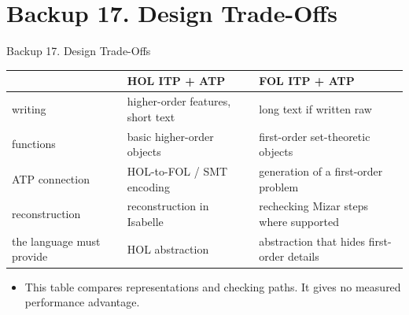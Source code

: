 \documentclass[aspectratio=169,11pt]{beamer}
\begin{document}
\section{Backup 17. Design Trade-Offs}
\begin{frame}[fragile,t]{Backup 17. Design Trade-Offs}
\begin{scriptsize}
\setlength{\tabcolsep}{3pt}
\renewcommand{\arraystretch}{1.15}
\begin{tabularx}{\textwidth}{>{\raggedright\arraybackslash}X>{\raggedright\arraybackslash}X>{\raggedright\arraybackslash}X}
\toprule
\textbf{} & \textbf{HOL ITP + ATP} & \textbf{FOL ITP + ATP} \\
\midrule
writing & higher-order features, short text & long text if written raw \\
functions & basic higher-order objects & first-order set-theoretic objects \\
ATP connection & HOL-to-FOL / SMT encoding & generation of a first-order problem \\
reconstruction & reconstruction in Isabelle & rechecking Mizar steps where supported \\
the language must provide & HOL abstraction & abstraction that hides first-order details \\
\bottomrule
\end{tabularx}
\end{scriptsize}

\begin{itemize}
\setlength{\itemsep}{1pt}
\setlength{\parsep}{0pt}
\setlength{\parskip}{0pt}
\item This table compares representations and checking paths. It gives no measured performance advantage.
\end{itemize}
\end{frame}
\end{document}
